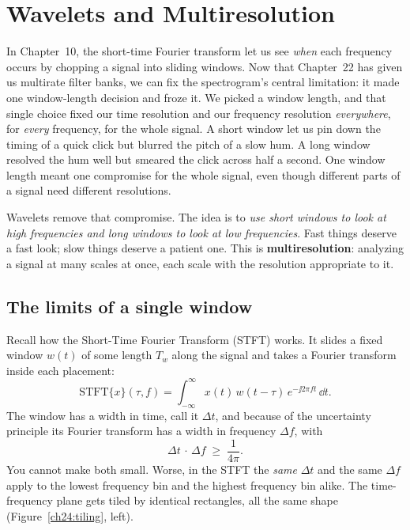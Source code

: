 \chapter{Wavelets and Multiresolution}

In Chapter~10, the short-time Fourier transform let us see \emph{when} each frequency
occurs by chopping a signal into sliding windows. Now that Chapter~22 has given us
multirate filter banks, we can fix the spectrogram's central limitation: it made one window-length decision and
froze it. We picked a window length, and that single choice fixed our time
resolution and our frequency resolution \emph{everywhere}, for \emph{every}
frequency, for the whole signal. A short window let us pin down the timing of a
quick click but blurred the pitch of a slow hum. A long window resolved the hum
well but smeared the click across half a second. One window length meant one
compromise for the whole signal, even though different parts of a signal need
different resolutions.

Wavelets remove that compromise. The idea is to \emph{use short windows to look
at high frequencies and long windows to look at low frequencies}. Fast things
deserve a fast look; slow things deserve a patient one. This is
\textbf{multiresolution}: analyzing a signal at many scales at once, each scale
with the resolution appropriate to it.

\chapterline

\section{The limits of a single window}
\label{ch24:tyranny}

Recall how the Short-Time Fourier Transform
(STFT) works. It slides a fixed window $w(t)$ of some length $T_w$ along the
signal and takes a Fourier transform inside each placement:
\begin{equation}
\label{ch24:stft}
\text{STFT}\{x\}(\tau, f) = \int_{-\infty}^{\infty} x(t)\, w(t-\tau)\,
e^{-\jj 2\pi f t}\,\dd t.
\end{equation}
The window has a width in time, call it $\Delta t$, and because of the
uncertainty principle its Fourier transform has a width in frequency
$\Delta f$, with
\begin{equation}
\label{ch24:uncertainty}
\Delta t \,\cdot\, \Delta f \;\ge\; \frac{1}{4\pi}.
\end{equation}
You cannot make both small. Worse, in the STFT the \emph{same} $\Delta t$ and the
same $\Delta f$ apply to the lowest frequency bin and the highest frequency bin
alike. The time-frequency plane gets tiled by identical rectangles, all the same
shape (Figure~\ref{ch24:tiling}, left).

